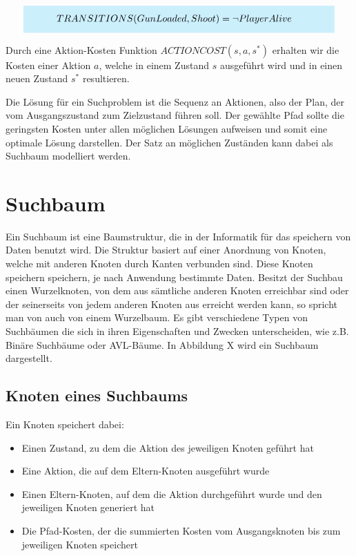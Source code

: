 \[
\highlightbox{0.9\textwidth}{$
    \begin{aligned}
			TRANSITIONS(GunLoaded, Shoot) &= \lnot PlayerAlive
    \end{aligned}
$}
\]

Durch eine Aktion-Kosten Funktion $ACTIONCOST(s,a,s^*)$ erhalten wir die Kosten einer Aktion $a$, welche in einem Zustand $s$ ausgeführt wird und in einen neuen Zustand $s^*$ resultieren.

Die Lösung für ein Suchproblem ist die Sequenz an Aktionen, also der Plan, der vom Ausgangszustand zum Zielzustand führen soll. Der gewählte Pfad sollte die geringsten Kosten unter allen möglichen Lösungen aufweisen und somit eine optimale Lösung darstellen. Der Satz an möglichen Zuständen kann dabei als Suchbaum modelliert werden.


\section{Suchbaum}

Ein Suchbaum ist eine Baumstruktur, die in der Informatik für das speichern von Daten benutzt wird. Die Struktur basiert auf einer Anordnung von Knoten, welche mit anderen Knoten durch Kanten verbunden sind. Diese Knoten speichern speichern, je nach Anwendung bestimmte Daten. Besitzt der Suchbau einen Wurzelknoten, von dem aus sämtliche anderen Knoten erreichbar sind oder der seinerseits von jedem anderen Knoten aus erreicht werden kann, so spricht man von auch von einem Wurzelbaum. Es gibt verschiedene Typen von Suchbäumen die sich in ihren Eigenschaften und Zwecken unterscheiden, wie z.B. Binäre Suchbäume oder AVL-Bäume. In Abbildung X wird ein Suchbaum dargestellt.

\subsection{Knoten eines Suchbaums}
Ein Knoten speichert dabei:
\begin{itemize}
	\item Einen Zustand, zu dem die Aktion des jeweiligen Knoten geführt hat
	\item Eine Aktion, die auf dem Eltern-Knoten ausgeführt wurde
	\item Einen Eltern-Knoten, auf dem die Aktion durchgeführt wurde und den jeweiligen Knoten generiert hat
	\item Die Pfad-Kosten, der die summierten Kosten vom Ausgangsknoten bis zum jeweiligen Knoten speichert
\end{itemize}

